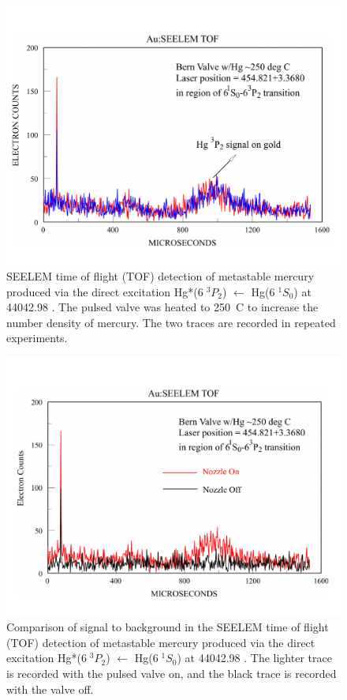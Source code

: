 \begin{figure}
  \caption{SEELEM time of flight (TOF) detection of metastable mercury
    produced via the direct excitation Hg*($6 \; ^3P_2$) $\leftarrow$
    Hg($6 \; ^1S_0$) at 44042.98 \rcm.  The pulsed valve was heated to
    250\degrees\ C to increase the number density of mercury.  The two
    traces are recorded in repeated experiments.}
\label{fig:hg-3p2-direct}
\centering
\includegraphics[width=8in,angle=90]{hg-3p2-direct.pdf}
\end{figure}

\begin{figure}
  \caption{Comparison of signal to background in the SEELEM time of
    flight (TOF) detection of metastable mercury produced via the
    direct excitation Hg*($6 \; ^3P_2$) $\leftarrow$ Hg($6 \; ^1S_0$)
    at 44042.98 \rcm.  The lighter trace is recorded with the pulsed
    valve on, and the black trace is recorded with the valve off.}
\label{fig:hg-3p2-direct-bg}
\centering
\includegraphics[width=8in,angle=90]{hg-3p2-direct-bg.pdf}
\end{figure}


